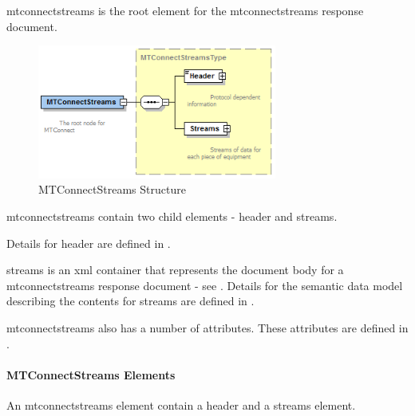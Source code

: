 \documentclass{mtconnect}	%
\begin{document}
\gls{mtconnectstreams} is the \gls{root element} for the \gls{mtconnectstreams response document}.  

\begin{figure}[ht]
  \centering
  \includegraphics[width=0.7\textwidth]{figures/mtconnectstreams-structure.png}
  \caption{MTConnectStreams Structure}
  \label{fig:mtconnectstreams-structure}
\end{figure}

\FloatBarrier

\gls{mtconnectstreams} \MUST contain two \glspl{child element} - \gls{header} and \gls{streams}.  

Details for \gls{header} are defined in .  

\gls{streams} is an \gls{xml} container that represents the \gls{document body} for a \gls{mtconnectstreams response document} - see .  Details for the \gls{semantic data model} describing the contents for \gls{streams} are defined in .

\gls{mtconnectstreams} also has a number of attributes.  These attributes are defined in .

\newpage

\paragraph{MTConnectStreams Elements}\mbox{}

An \gls{mtconnectstreams} element \MUST contain a \gls{header} and a \gls{streams} element.
\end{document}
